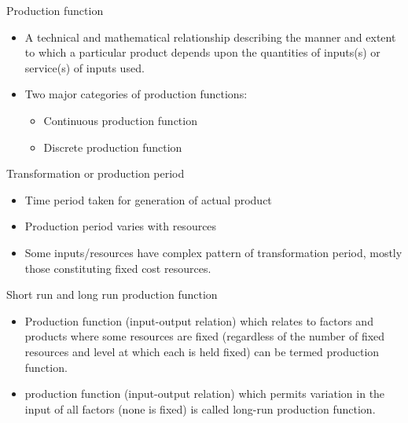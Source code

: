 \documentclass[12pt,ignorenonframetext,aspectratio=169]{beamer}
\providecommand{\tightlist}{%
  \setlength{\itemsep}{0pt}\setlength{\parskip}{0pt}}
\begin{document}
\begin{frame}{}
\protect\hypertarget{section-6}{}

\begin{block}{Production function}

\begin{itemize}
\tightlist
\item
  A technical and mathematical relationship describing the manner and
  extent to which a particular product depends upon the quantities of
  inputs(s) or service(s) of inputs used.
\item
  Two major categories of production functions:

  \begin{itemize}
  \tightlist
  \item
    Continuous production function
  \item
    Discrete production function
  \end{itemize}
\end{itemize}

\end{block}

\begin{block}{Transformation or production period}

\begin{itemize}
\tightlist
\item
  Time period taken for generation of actual product
\item
  Production period varies with resources
\item
  Some inputs/resources have complex pattern of transformation period,
  mostly those constituting fixed cost resources.
\end{itemize}

\end{block}

\end{frame}

\begin{frame}{}
\protect\hypertarget{section-7}{}

\begin{block}{Short run and long run production function}

\begin{itemize}
\tightlist
\item
  Production function (input-output relation) which relates to factors
  and products where some resources are fixed (regardless of the number
  of fixed resources and level at which each is held fixed) can be
  termed  production function.
\item
  production function (input-output relation) which permits variation in
  the input of all factors (none is fixed) is called \alert{long-run}
  production function.
\end{itemize}

\end{block}

\end{frame}
\end{document}

